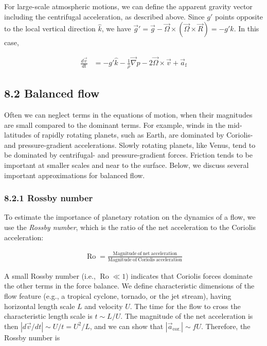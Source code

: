 \documentclass[11pt]{article}
\begin{document}
For large-scale atmospheric motions, we can define the apparent gravity
vector including the centrifugal acceleration, as described above. Since
\(g'\) points opposite to the local vertical direction \(\hat{k}\), we
have
\(\vec{g}' = \vec{g} - \vec{\Omega}\times(\vec{\Omega}\times\vec{R}) = -g'\hat{k}\).
In this case,

\begin{align}
    \frac{d\vec{v}}{dt} &= -g'\hat{k} - \frac{1}{\rho}\vec{\nabla}p - 2\vec{\Omega}\times\vec{v} + \vec{a}_\mathrm{f}
\end{align}

    \subsection{8.2 Balanced flow}\label{balanced-flow}

Often we can neglect terms in the equations of motion, when their
magnitudes are small compared to the dominant terms. For example, winds
in the mid-latitudes of rapidly rotating planets, such as Earth, are
dominated by Coriolis- and pressure-gradient accelerations. Slowly
rotating planets, like Venus, tend to be dominated by centrifugal- and
pressure-gradient forces. Friction tends to be important at smaller
scales and near to the surface. Below, we discuss several important
approximations for balanced flow.

\subsubsection{8.2.1 Rossby number}\label{rossby-number}

To estimate the importance of planetary rotation on the dynamics of a
flow, we use the \emph{Rossby number}, which is the ratio of the net
acceleration to the Coriolis acceleration:

\begin{align}
\operatorname{Ro} = \frac{\mathrm{Magnitude~of~net~acceleration}}{\mathrm{Magnitude~of~Coriolis~acceleration}}
\end{align}

A small Rossby number (i.e., \(\operatorname{Ro} \ll 1\)) indicates that
Coriolis forces dominate the other terms in the force balance. We define
characteristic dimensions of the flow feature (e.g., a tropical cyclone,
tornado, or the jet stream), having horizontal length scale \(L\) and
velocity \(U\). The time for the flow to cross the characteristic length
scale is \(t \sim L/U\). The magnitude of the net acceleration is then
\(|d\vec{v}/dt| \sim U/t = U^2/L\), and we can show that
\(|\vec{a}_\mathrm{cor.}| \sim fU\). Therefore, the Rossby number is
\end{document}
